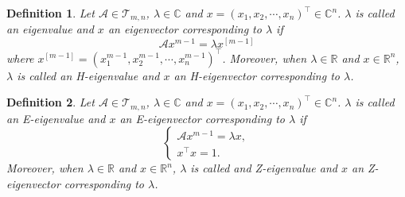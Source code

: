 \documentclass[twoside]{article}
\newtheorem{definition}{Definition}[section]
\begin{document}

\begin{definition}\label{defh}\textup{\cite{qi2005}}
Let ${\mathcal{A}}\in{\mathcal{T}}_{m,n}$, $\lambda\in\mathbb{C}$ and $x=(x_1,x_2,\cdots,x_n)^\top\in\mathbb{C}^n$.
$\lambda$ is called an eigenvalue and $x$ an eigenvector corresponding to $\lambda$ if
\begin{equation}\label{1.1}
\mathcal{A}x^{m-1}=\lambda x^{[m-1]}
\end{equation}
where $x^{[m-1]}=(x_1^{m-1},x_2^{m-1},\cdots,x_n^{m-1})^\top$.
Moreover, when $\lambda\in\mathbb{R}$ and $x\in\mathbb{R}^n$, $\lambda$ is called an H-eigenvalue and $x$ an H-eigenvector corresponding to $\lambda$.
\end{definition}

\begin{definition}\label{defz}\textup{\cite{qi2005}}
Let ${\mathcal{A}}\in{\mathcal{T}}_{m,n}$, $\lambda\in\mathbb{C}$ and $x=(x_1,x_2,\cdots,x_n)^\top\in\mathbb{C}^n$.
$\lambda$ is called an E-eigenvalue and $x$ an E-eigenvector corresponding to $\lambda$ if
\begin{equation}\label{1.2}
\left
\{\begin{array}{ll}
\mathcal{A}x^{m-1}=\lambda x,\\
x^{\top}x=1.
\end{array}
\right.
\end{equation}
Moreover, when $\lambda\in\mathbb{R}$ and $x\in\mathbb{R}^n$, $\lambda$ is called and Z-eigenvalue and $x$ an Z-eigenvector corresponding to $\lambda$.
\end{definition}
\end{document}
